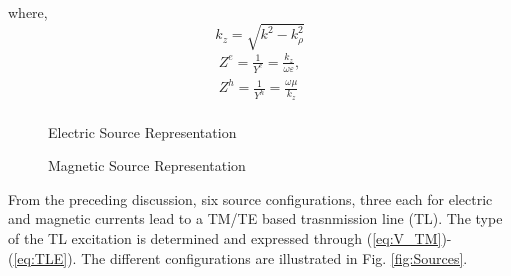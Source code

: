 \documentclass[11pt]{article}
\renewcommand{\O}{\omega}  %
\newcommand{\E}{\varepsilon}  %
\renewcommand{\u}{\mu}  %
\newcommand{\p}{\rho}  %
\renewcommand{\^}{\hat}  %
\begin{document}
  where,
  \begin{equation}
    k_z = \sqrt{k^2 - k_{\p}^2}
    \label{eq:k_z}
  \end{equation}
  \begin{equation}
    \begin{split}
      Z^e = \frac{1}{Y^e} = \frac{k_z}{\O \E},\\
      Z^h = \frac{1}{Y^h} = \frac{\O \u}{k_z}\\
    \end{split}
    \label{eq:Z}
  \end{equation}

  \begin{figure}[h]
    \centering
    \subfloat[]{
    \centering
    {}
    \label{fig:jx_source}
    }
    \newline
    \subfloat[]{
    \centering
    {}
    \label{fig:jy_source}
    }
    \newline
    \subfloat[]{ %
    \centering
    {}
    \label{fig:jz_source}
    }
    \newline
    \caption{Electric Source Representation}
    \label{fig:J_sources}
  \end{figure}

  \begin{figure}[h]
    \centering
    \subfloat[]{
    \centering
    {}
    \label{fig:mx_source}
    }
    \newline
    \subfloat[]{
    \centering
    {}
    \label{fig:my_source}
    }
    \newline
    \subfloat[]{ %
    \centering
    {}
    \label{fig:mz_source}
    }
    \newline
    \caption{Magnetic Source Representation}
    \label{fig:M_sources}
  \end{figure}
  From the preceding discussion, six source configurations, three each for electric and magnetic currents lead to a TM/TE based trasnmission line (TL). The type of the TL excitation is determined and expressed through (\ref{eq:V_TM})-(\ref{eq:TLE}). The different configurations are illustrated in Fig. \ref{fig:Sources}.

  \clearpage %
  
  
\end{document}
